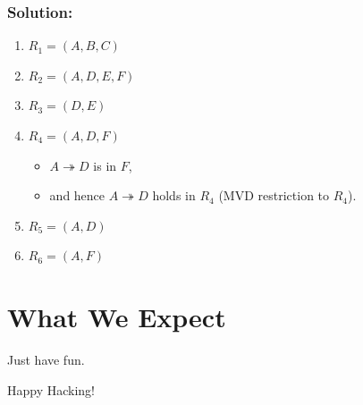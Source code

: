 \documentclass{article}
\begin{document}
\subsubsection*{Solution:}
\begin{enumerate}
    \item $R_1 = (A, B, C)$         \quad [$R_1$ is in 4NF]
    \item $R_2 = (A, D, E, F)$       
    \item $R_3 = (D, E)$            \quad [$R_3$ is in 4NF]
    \item $R_4 = (A, D, F)$         
        \begin{itemize}
            \item $A \twoheadrightarrow D$ is in $F$,
            \item and hence $A \twoheadrightarrow D$ holds in $R_4$ (MVD restriction to $R_4$).
        \end{itemize}
    \item $R_5 = (A, D)$            \quad [$R_5$ is in 4NF]
    \item $R_6 = (A, F)$            \quad [$R_6$ is in 4NF]
\end{enumerate}


\section{What We Expect}
Just have fun.

\vspace{5mm}
Happy Hacking! 
\end{document}
